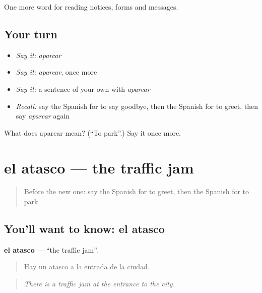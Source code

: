 \begin{grammarlens}[title={What you've built}]
One more word for reading notices, forms and messages.
\end{grammarlens}

\subsection*{Your turn}
\begin{itemize}
\raggedright
  \item \emph{Say it:} \emph{aparcar}
  \item \emph{Say it:} \emph{aparcar}, once more
  \item \emph{Say it:} a sentence of your own with \emph{aparcar}
  \item \emph{Recall:} say the Spanish for to say goodbye, then the Spanish for to greet, then say \emph{aparcar} again
\end{itemize}

\begin{tcolorbox}[breakable,colback=teal!4,colframe=teal!35!black,title={Before you move on}]
What does aparcar mean? (\textquotedblleft{}To park\textquotedblright{}.) Say it once more.
\end{tcolorbox}
\section[el atasco]{el atasco — the traffic jam}

\label{lesson:ES-C489-atasco}



\begin{quote}
Before the new one: say the Spanish for to greet, then the Spanish for to park.
\end{quote}

\subsection*{You'll want to know: el atasco}
\textbf{el atasco} — \textquotedblleft{}the traffic jam\textquotedblright{}.

\begin{quote}
Hay un atasco a la entrada de la ciudad.
\end{quote}

\begin{quote}
\emph{There is a traffic jam at the entrance to the city.}
\end{quote}

